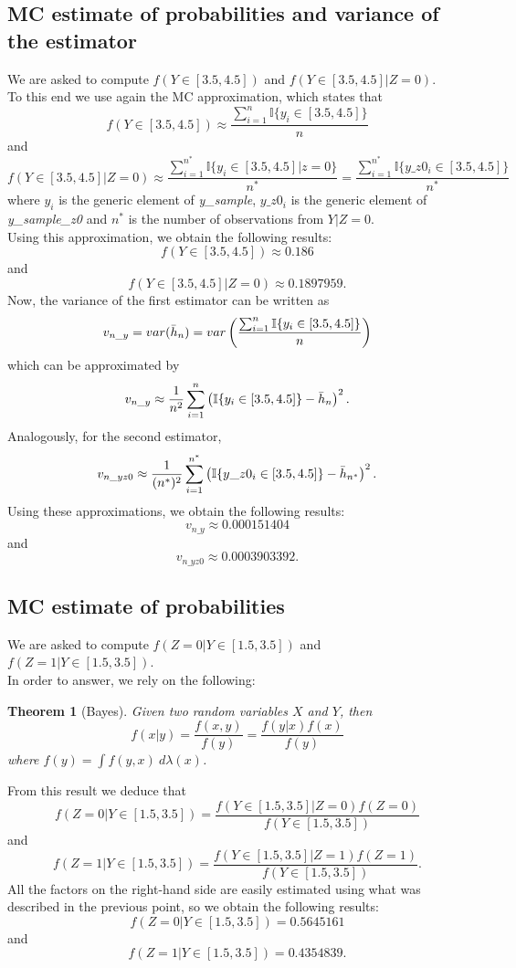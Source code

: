 \documentclass[a4paper,12pt]{article}
\newtheorem{theorem}{Theorem}[section]
\begin{document}
\subsection{MC estimate of probabilities and variance of the estimator}
 We are asked to compute \( f(Y \in [3.5,4.5]) \) and \(f(Y \in [3.5,4.5]|Z = 0)\). \\
 To this end we use again the MC approximation, which states that
 \[f(Y \in [3.5,4.5]) \approx \frac{\sum_{i=1}^{n} \mathbb{I}\{ y_i \in [3.5,4.5] \}}{n}\]
 and
 \[f(Y \in [3.5,4.5]|Z=0) \approx \frac{\sum_{i=1}^{n^*} \mathbb{I}\{ y_i \in [3.5,4.5]|z = 0 \}}{n^*} = \frac{\sum_{i=1}^{n^*} \mathbb{I}\{ y\_z0_i \in [3.5,4.5]\}}{n^*}\]
 where \(y_i\) is the generic element of \textit{y\_sample}, \(y\_z0_i\) is the generic element of \textit{y\_sample\_z0} and \(n^*\) is the number of observations from \(Y|Z = 0\). \\
 Using this approximation, we obtain the following results:
 \[f(Y \in [3.5,4.5]) \approx 0.186\]
 and
 \[f(Y \in [3.5,4.5]|Z=0) \approx 0.1897959.\]
Now, the variance of the first estimator can be written as
\[ v_{n\_y} = var(\Bar{h}_n) = var\left( \frac{\sum_{i=1}^{n} \mathbb{I}\{ y_i \in [3.5,4.5] \}}{n} \right)\]
which can be approximated by
\[v_{n\_y} \approx \frac{1}{n^2} \sum_{i = 1}^{n} \left( \mathbb{I}\{ y_i \in [3.5,4.5] \} - \Bar{h}_n \right)^2.\]
Analogously, for the second estimator,
\[ v_{n\_yz0} \approx \frac{1}{(n^*)^2} \sum_{i = 1}^{n^*} \left( \mathbb{I}\{ y\_z0_i \in [3.5,4.5] \} - \Bar{h}_{n^*} \right)^2.\]
Using these approximations, we obtain the following results:
\[ v_{n\_y} \approx 0.000151404\]
and
\[ v_{n\_yz0} \approx 0.0003903392.\]

\subsection{MC estimate of probabilities}
We are asked to compute \( f(Z = 0|Y \in [1.5,3.5]) \) and \(f(Z = 1|Y \in [1.5,3.5]) \). \\
In order to answer, we rely on the following:
\begin{theorem}[Bayes]
    Given two random variables \(X\) and \(Y\), then
    \[f(x|y) = \frac{f(x,y)}{f(y)} = \frac{f(y|x)f(x)}{f(y)}\]
    where \(f(y) = \int f(y,x) \ d\lambda(x)\).
\end{theorem}
From this result we deduce that
\[f(Z=0|Y \in [1.5,3.5]) = \frac{f(Y \in [1.5,3.5]|Z=0) f(Z=0)}{f(Y \in [1.5,3.5])}\]
and
\[f(Z=1|Y \in [1.5,3.5]) = \frac{f(Y \in [1.5,3.5]|Z=1) f(Z=1)}{f(Y \in [1.5,3.5])}.\]
All the factors on the right-hand side are easily estimated using what was described in the previous point, so we obtain the following results:
\[f(Z=0|Y \in [1.5,3.5]) = 0.5645161\]
and
\[f(Z=1|Y \in [1.5,3.5]) = 0.4354839.\]
\end{document}
